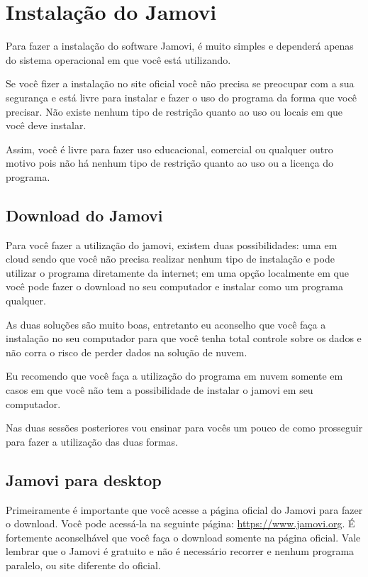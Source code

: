 \section{Instalação do Jamovi}

Para fazer a instalação do software Jamovi, é muito simples e dependerá apenas do sistema operacional em que você está utilizando.

Se você fizer a instalação no site oficial você não precisa se preocupar com a sua segurança e está livre para instalar e fazer o uso do programa da forma que você precisar. Não existe nenhum tipo de restrição quanto ao uso ou locais em que você deve instalar.

Assim, você é livre para fazer uso educacional, comercial ou qualquer outro motivo pois não há nenhum tipo de restrição quanto ao uso ou a licença do programa.

\subsection{Download do Jamovi}

Para você fazer a utilização do jamovi, existem duas possibilidades: uma em cloud sendo que você não precisa realizar nenhum tipo de instalação e pode utilizar o programa diretamente da internet; em uma opção localmente em que você pode fazer o download no seu computador e instalar como um programa qualquer.

As duas soluções são muito boas, entretanto eu aconselho que você faça a instalação no seu computador para que você tenha total controle sobre os dados e não corra o risco de perder dados na solução de nuvem.

Eu recomendo que você faça a utilização do programa em nuvem somente em casos em que você não tem a possibilidade de instalar o jamovi em seu computador.

Nas duas sessões posteriores vou ensinar para vocês um pouco de como prosseguir para fazer a utilização das duas formas.

\subsection{Jamovi para desktop}

Primeiramente é importante que você acesse a página oficial do Jamovi para fazer o download. Você pode acessá-la na seguinte página: \url{https://www.jamovi.org}. É fortemente aconselhável que você faça o download somente na página oficial. Vale lembrar que o Jamovi é gratuito e não é necessário recorrer e nenhum programa paralelo, ou site diferente do oficial.

